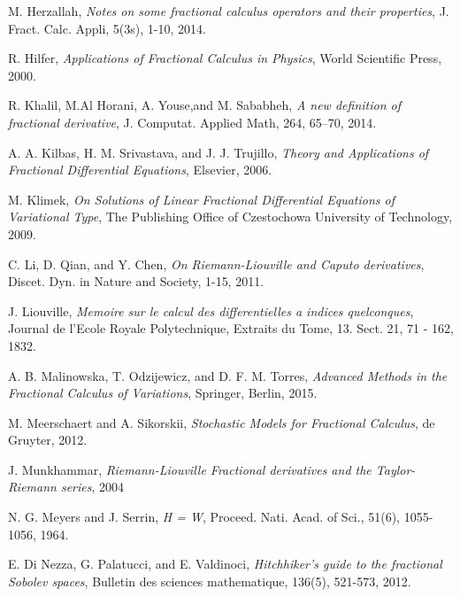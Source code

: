 \documentclass[leqno,final]{siamltex}
\numberwithin{equation}{section}
\renewcommand{\(}{\bigl(}
\renewcommand{\)}{\bigr)}
\begin{document}
\begin{thebibliography}{99}
{\sc M. Herzallah},
{\em Notes on some fractional calculus operators and their properties},
J. Fract. Calc.  Appli, 5(3s), 1-10, 2014.

{\sc R. Hilfer},
{\em  Applications of Fractional Calculus in Physics},
World Scientific Press, 2000.


{\sc R. Khalil, M.Al Horani, A. Youse,and M. Sababheh},
{\em A new definition of fractional derivative},
J. Computat. Applied Math,  264, 65--70, 2014.


{\sc A. A. Kilbas, H. M. Srivastava, and J. J. Trujillo},
{\em Theory and Applications of Fractional Differential Equations}, 
Elsevier, 2006. 	

{\sc M. Klimek},
{\em On Solutions of Linear Fractional Differential Equations of Variational Type},
The Publishing Office of Czestochowa University of Technology, 2009.

    {\sc C. Li, D. Qian, and  Y. Chen},
    {\em On Riemann-Liouville and Caputo derivatives},
   Discet. Dyn. in Nature and Society, 1-15,  2011.

    {\sc J. Liouville},
    {\em Memoire sur le calcul des differentielles a indices quelconques},
    Journal de l'Ecole Royale Polytechnique, Extraits du Tome,  13. Sect. 21, 71 - 162, 1832.


{\sc A. B. Malinowska, T. Odzijewicz, and D. F. M. Torres},
  {\em Advanced Methods in the Fractional Calculus of Variations},
   Springer, Berlin,  2015.


{\sc M. Meerschaert and A. Sikorskii},
  {\em Stochastic Models for Fractional Calculus},   de Gruyter,  2012.
   
{\sc J. Munkhammar},
{\em Riemann-Liouville Fractional derivatives and the Taylor-Riemann series},
 2004
 
 {\sc N. G. Meyers and J. Serrin},
 {\em H = W}, 
Proceed. Nati. Acad. of Sci., 51(6), 1055-1056, 1964.

    {\sc E. Di Nezza, G. Palatucci, and  E. Valdinoci},
    {\em Hitchhiker's guide to the fractional Sobolev spaces},
    Bulletin des sciences mathematique, 136(5), 521-573, 2012. 
    

\end{thebibliography}
\end{document}
